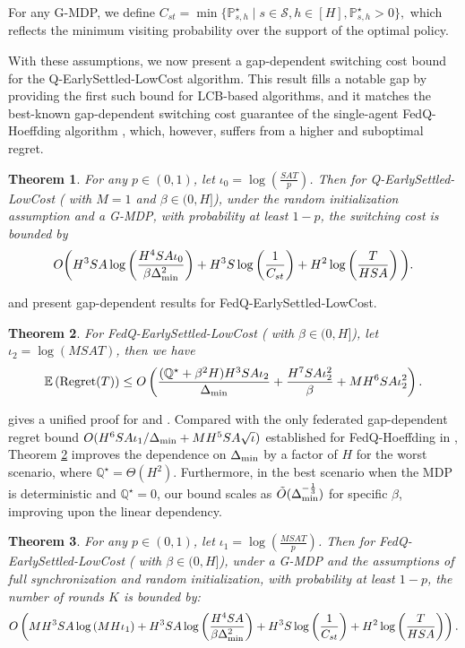 \documentclass{article}
\newtheorem{theorem}{Theorem}[section]
\def\dmin{\Delta_{\textnormal{min}}}
\begin{document}
For any G-MDP, we define $C_{st} = \min\{\mathbb{P}_{s,h}^{\star} \mid  s \in \mathcal{S}, h \in [H], \mathbb{P}_{s,h}^{\star}>0\},$
which reflects the minimum visiting probability over the support of the optimal policy.

With these assumptions, we now present a gap-dependent switching cost bound for the Q-EarlySettled-LowCost algorithm. This result fills a notable gap by providing the first such bound for LCB-based algorithms, and it matches the best-known gap-dependent switching cost guarantee of the single-agent FedQ-Hoeffding algorithm \cite{zhang2025gapdependent}, which, however, suffers from a higher and suboptimal regret.
\begin{theorem}
\label{thm_gapcost} 
For any $p \in (0,1)$, let $\iota_0 = \log (\frac{SAT}{p})$. Then for Q-EarlySettled-LowCost ( with $M=1$ and $\beta \in (0,H]$), under the random initialization assumption and a G-MDP, with probability at least $1-p$, the switching cost is bounded by
$$
O \bigg( H^3SA\log\bigg(\frac{H^4SA\iota_0}{\beta\dmin^2}\bigg)   +H^3S\log\left(\frac{1}{C_{st}}\right)  +H^2\log\left(\frac{T}{HSA}\right) \bigg) .
$$
\end{theorem}
 and  present gap-dependent results for FedQ-EarlySettled-LowCost.
\begin{theorem}
\label{fedthm_gapregret} 
For FedQ-EarlySettled-LowCost ( with $\beta \in (0,H]$), let $\iota_2 = \log (MSAT)$, then we have 
\begin{equation*}
\mathbb{E}\left(\textnormal{Regret}(T)\right) \leq O\left(\frac{(\mathbb{Q}^\star+\beta^2H)H^3SA\iota_2}{\dmin}+   \frac{H^7SA\iota_2^2}{\beta}+ MH^6SA\iota_2^2\right).
\end{equation*}
\end{theorem}
 gives a unified proof for  and . Compared with the only federated gap-dependent regret bound $O(H^6SA\iota_1/\dmin + MH^5SA\sqrt{\iota})$ established for FedQ-Hoeffding in \cite{zhang2025gapdependent}, Theorem \ref{fedthm_gapregret} improves the dependence on $\Delta_{\textnormal{min}}$ by a factor of $H$ for the worst scenario, where $\mathbb{Q}^\star = \Theta(H^2)$. Furthermore, in the best scenario when the MDP is deterministic and \( \mathbb{Q}^\star = 0 \), our bound scales as \( \tilde{O}(\Delta_{\textnormal{min}}^{-\frac{1}{3}})\) for specific $\beta$, improving upon the linear dependency.
\begin{theorem}
\label{thm_fedgapcost} 
For any $p \in (0,1)$, let $\iota_1 = \log (\frac{MSAT}{p})$. Then for FedQ-EarlySettled-LowCost ( with $\beta \in (0,H]$), under a G-MDP and the assumptions of full synchronization and random initialization, with probability at least $1-p$, the number of rounds $K$ is bounded by:
\begin{equation*}
O \left( MH^3SA\log\left(MH\iota_1\right)+ H^3SA\log\left(\frac{H^4SA}{\beta\dmin^2}\right)   +H^3S\log\left(\frac{1}{C_{st}}\right)  +H^2\log\left(\frac{T}{HSA}\right) \right).
\end{equation*}
\end{theorem}       
\end{document}
